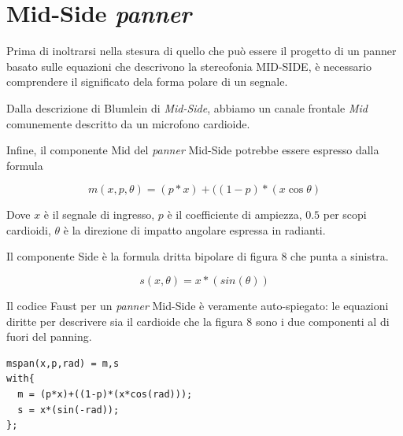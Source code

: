 \section{Mid-Side \emph{panner}}
\label{sec:mspanner}

Prima di inoltrarsi nella stesura di quello che può essere il progetto di un
panner basato sulle equazioni che descrivono la stereofonia MID-SIDE, è
necessario comprendere il significato dela forma polare di un segnale.

Dalla descrizione di Blumlein di \emph{Mid-Side}, abbiamo un canale frontale
\emph{Mid} comunemente descritto da un microfono cardioide. 

Infine, il componente Mid del \emph{panner} Mid-Side potrebbe essere espresso dalla
formula

\begin{equation}
m(x,p,\theta) = (p*x) + ((1-p)*(x\cos\theta)
\label{eq:mid}
\end{equation}

Dove $ x $ è il segnale di ingresso, $ p $ è il coefficiente di ampiezza, $0.5$
per scopi cardioidi, $\theta$ è la direzione di impatto angolare espressa in
radianti.

Il componente Side è la formula dritta bipolare di figura 8 che punta a sinistra.

\begin{equation}
s(x,\theta) = x*(sin(\theta))
\label{eq:side}
\end{equation}

Il codice Faust per un \emph{panner} Mid-Side è veramente auto-spiegato: le equazioni
diritte per descrivere sia il cardioide che la figura 8 sono i due componenti
al di fuori del panning.

\begin{lstlisting}
mspan(x,p,rad) = m,s
with{
  m = (p*x)+((1-p)*(x*cos(rad)));
  s = x*(sin(-rad));
};
\end{lstlisting}

